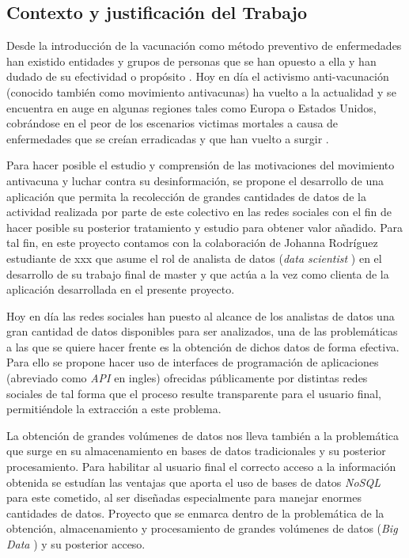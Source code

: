 \documentclass[11pt,a4paper]{article}
\begin{document}
\subsection{Contexto y justificación del Trabajo}
Desde la introducción de la vacunación como método preventivo de enfermedades han existido entidades y grupos de personas que se han opuesto a ella y han dudado de su efectividad o propósito \cite{1}. Hoy en día el activismo anti-vacunación (conocido también como movimiento antivacunas) ha vuelto a la actualidad y se encuentra en auge en algunas regiones tales como Europa o Estados Unidos, cobrándose en el peor de los escenarios victimas mortales a causa de enfermedades que se creían erradicadas y que han vuelto a surgir \cite{2}\cite{3}. 

Para hacer posible el estudio y comprensión de las motivaciones del movimiento antivacuna y luchar contra su desinformación, se propone el desarrollo de una aplicación que permita la recolección de grandes cantidades de datos de la actividad realizada por parte de este colectivo en las redes sociales con el fin de hacer posible su posterior tratamiento y estudio para obtener valor añadido. Para tal fin, en este proyecto contamos con la colaboración de Johanna Rodríguez estudiante de xxx que asume el rol de analista de datos (\textit{data scientist} \cite{4}) en el desarrollo de su trabajo final de master y que actúa a la vez como clienta de la aplicación desarrollada en el presente proyecto.
\linebreak

Hoy en día las redes sociales han puesto al alcance de los analistas de datos una gran cantidad de datos disponibles para ser analizados, una de las problemáticas a las que se quiere hacer frente es la obtención de dichos datos de forma efectiva. Para ello se propone hacer uso de interfaces de programación de aplicaciones (abreviado como \textit{API} \cite{6} en ingles) ofrecidas públicamente por distintas redes sociales de tal forma que el proceso resulte transparente para el usuario final, permitiéndole la extracción a este problema. 

La obtención de grandes volúmenes de datos nos lleva también a la problemática que surge en su almacenamiento en bases de datos tradicionales y su posterior procesamiento. Para habilitar al usuario final el correcto acceso a la información obtenida se estudían las ventajas que aporta el uso de bases de datos \textit{NoSQL} \cite{7} para este cometido, al ser diseñadas especialmente para manejar enormes cantidades de datos. Proyecto que se enmarca dentro de la problemática de la obtención, almacenamiento y procesamiento de grandes volúmenes de datos (\textit{Big Data} \cite{5}) y su posterior acceso.
\end{document}
